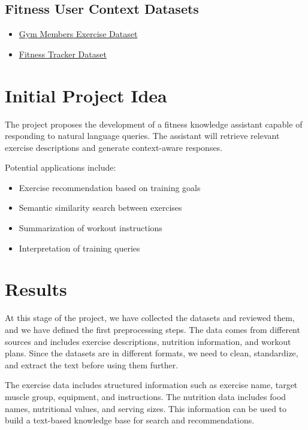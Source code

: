 \documentclass[fleqn,moreauthors,10pt]{ds_report}
\begin{document}
\subsection*{Fitness User Context Datasets}

\begin{itemize}
\item \href{https://www.kaggle.com/datasets/valakhorasani/gym-members-exercise-dataset}{Gym Members Exercise Dataset}
\item \href{https://www.kaggle.com/datasets/nadeemajeedch/fitness-tracker-dataset}{Fitness Tracker Dataset}
\end{itemize}

\section*{Initial Project Idea}

The project proposes the development of a fitness knowledge assistant capable of responding to natural language queries. The assistant will retrieve relevant exercise descriptions and generate context-aware responses.

Potential applications include:

\begin{itemize}
\item Exercise recommendation based on training goals
\item Semantic similarity search between exercises
\item Summarization of workout instructions
\item Interpretation of training queries
\end{itemize}

\section*{Results}

At this stage of the project, we have collected the datasets and reviewed them, and we have defined the first preprocessing steps. The data comes from different sources and includes exercise descriptions, nutrition information, and workout plans. Since the datasets are in different formats, we need to clean, standardize, and extract the text before using them further.

The exercise data includes structured information such as exercise name, target muscle group, equipment, and instructions. The nutrition data includes food names, nutritional values, and serving sizes. This information can be used to build a text-based knowledge base for search and recommendations.
\end{document}
